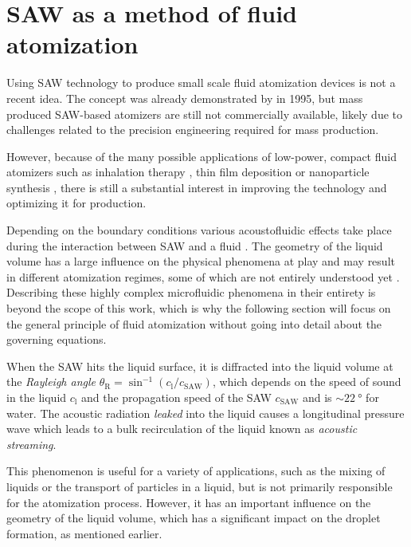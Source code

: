\section{SAW as a method of fluid atomization}
\label{sec:saw_vapour}

Using SAW technology to produce small scale fluid atomization devices is not a recent idea. 
The concept was already demonstrated by \cite{kurosawaSurfaceAcousticWave1995} in 1995, but mass produced SAW-based atomizers are still not commercially available, likely due to challenges related to the precision engineering required for mass production.

However, because of the many possible applications of low-power, compact fluid atomizers such as inhalation therapy \cite{qiMiniatureInhalationTherapy2009a}, thin film deposition \cite{murochiDepositionThinFilm2007} or nanoparticle synthesis \cite{alvarezRapidGenerationProtein2008}, there is still a substantial interest in improving the technology and optimizing it for production.

Depending on the boundary conditions various acoustofluidic effects take place during the interaction between SAW and a fluid \cite{winklerSAWbasedFluidAtomization2015a}.
The geometry of the liquid volume has a large influence on the physical phenomena at play and may result in different atomization regimes, some of which are not entirely understood yet \cite{collinsAtomizationThinWater2012,huangExperimentalResearchSurface2022}.
Describing these highly complex microfluidic phenomena in their entirety is beyond the scope of this work, which is why the following section will focus on the general principle of fluid atomization without going into detail about the governing equations.

When the SAW hits the liquid surface, it is diffracted into the liquid volume at the \emph{Rayleigh angle} $\theta_\text{R} = \sin^{-1}(c_\text{l}/c_\text{SAW})$, which depends on the speed of sound in the liquid $c_\text{l}$ and the propagation speed of the SAW $c_\text{SAW}$ and is $\sim\SI{22}{\degree}$ for water.
The acoustic radiation \emph{leaked} into the liquid causes a longitudinal pressure wave which leads to a bulk recirculation of the liquid known as \emph{acoustic streaming}.

This phenomenon is useful for a variety of applications, such as the mixing of liquids or the transport of particles in a liquid, but is not primarily responsible for the atomization process.
However, it has an important influence on the geometry of the liquid volume, which has a significant impact on the droplet formation, as mentioned earlier.

